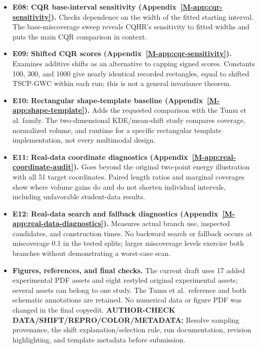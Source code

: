 \documentclass[10pt]{article}
\newcommand{\msapp}[1]{Appendix~\ref*{M-#1}}
\newcommand{\checkauthor}[2]{\textcolor{red!65!black}{\textbf{AUTHOR-CHECK #1:} #2}}
\begin{document}
\begin{itemize}
\item \textbf{E08: CQR base-interval sensitivity (\msapp{app:cqr-sensitivity}).}
Checks dependence on the width of the fitted starting interval. The base-miscoverage sweep reveals CQHR's sensitivity to fitted widths and puts the main CQR comparison in context.

\item \textbf{E09: Shifted CQR scores (\msapp{app:cqr-sensitivity}).}
Examines additive shifts as an alternative to capping signed scores. Constants 100, 300, and 1000 give nearly identical recorded rectangles, equal to shifted TSCP-GWC within each run; this is not a general invariance theorem.

\item \textbf{E10: Rectangular shape-template baseline (\msapp{app:shape-template}).}
Adds the requested comparison with the Tumu et al. family. The two-dimensional KDE/mean-shift study compares coverage, normalized volume, and runtime for a specific rectangular template implementation, not every multimodal design.

\item \textbf{E11: Real-data coordinate diagnostics (\msapp{app:real-coordinate-audit}).}
Goes beyond the original two-point energy illustration with all 51 target coordinates. Paired length ratios and marginal coverages show where volume gains do and do not shorten individual intervals, including unfavorable student-data results.

\item \textbf{E12: Real-data search and fallback diagnostics (\msapp{app:real-data-diagnostics}).}
Measures actual branch use, inspected candidates, and construction times. No backward search or fallback occurs at miscoverage 0.1 in the tested splits; larger miscoverage levels exercise both branches without demonstrating a worst-case scan.

\item \textbf{Figures, references, and final checks.} The current draft uses
17 added experimental PDF assets and eight restyled original experimental
assets; several assets can belong to one study. The Tumu et al.\ reference
and both schematic annotations are retained. No numerical data or figure
PDF was changed in the final copyedit.
\checkauthor{DATA/SHIFT/REPRO/COLOR/METADATA}{Resolve sampling provenance,
the shift explanation/selection rule, run documentation, revision
highlighting, and template metadata before submission.}
\end{itemize}
\end{document}
